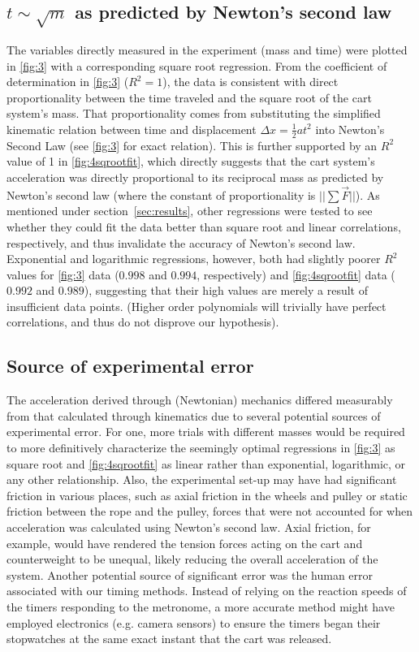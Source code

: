 \documentclass[reprint,amsmath,amssymb,aps,twoside]{revtex4-2}
\begin{document}
\subsection{$t \sim \sqrt{m}$ as predicted by Newton's second law}
The variables directly measured in the experiment (mass and time) were plotted in \cref{fig:3} with a corresponding square root regression. From the coefficient of determination in \cref{fig:3} ($R^2=1$), the data is consistent with direct proportionality between the time traveled and the square root of the cart system's mass. That proportionality comes from substituting the simplified kinematic relation between time and displacement $\Delta x=\frac{1}{2}at^2$ into Newton's Second Law (see \cref{fig:3} for exact relation). This is further supported by an $R^2$ value of 1 in \cref{fig:4sqrootfit}, which directly suggests that the cart system's acceleration was directly proportional to its reciprocal mass as predicted by Newton's second law (where the constant of proportionality is $||\sum\vec{F}||$). As mentioned under section~\ref{sec:results}, other regressions were tested to see whether they could fit the data better than square root and linear correlations, respectively, and thus invalidate the accuracy of Newton's second law. Exponential and logarithmic regressions, however, both had slightly poorer $R^2$ values for \cref{fig:3} data ($0.998$ and $0.994$, respectively) and \cref{fig:4sqrootfit} data ($0.992$ and $0.989$), suggesting that their high values are merely a result of insufficient data points. (Higher order polynomials will trivially have perfect correlations, and thus do not disprove our hypothesis).


\subsection{Source of experimental error}
The acceleration derived through (Newtonian) mechanics differed measurably from that calculated through kinematics due to several potential sources of experimental error. For one, more trials with different masses would be required to more definitively characterize the seemingly optimal regressions in \cref{fig:3} as square root and \cref{fig:4sqrootfit} as linear rather than exponential, logarithmic, or any other relationship. Also, the experimental set-up may have had significant friction in various places, such as axial friction in the wheels and pulley or static friction between the rope and the pulley, forces that were not accounted for when acceleration was calculated using Newton's second law. Axial friction, for example, would have rendered the tension forces acting on the cart and counterweight to be unequal, likely reducing the overall acceleration of the system. Another potential source of significant error was the human error associated with our timing methods. Instead of relying on the reaction speeds of the timers responding to the metronome, a more accurate method might have employed electronics (e.g. camera sensors) to ensure the timers began their stopwatches at the same exact instant that the cart was released.
\end{document}
